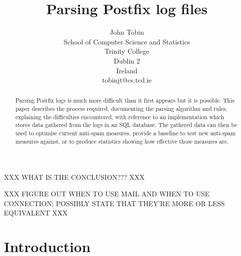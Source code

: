 \documentclass[a4paper,12pt,draft]{article}
\begin{document}
\title{Parsing Postfix log files}
\author{John Tobin \\ School of Computer Science and Statistics \\ 
Trinity College \\ Dublin 2 \\ Ireland \\ tobinjt@cs.tcd.ie}
\date{}
\maketitle

\begin{abstract}

    Parsing Postfix logs is much more difficult than it first appears but
    it is possible.  This paper describes the process required, documenting
    the parsing algorithm and rules, explaining the difficulties
    encountered, with reference to an implementation which stores data
    gathered from the logs in an SQL database.  The gathered data can then
    be used to optimise current anti-spam measures, provide a baseline to
    test new anti-spam measures against, or to produce statistics showing
    how effective those measures are.

\end{abstract}

XXX WHAT IS THE CONCLUSION??? XXX

XXX FIGURE OUT WHEN TO USE MAIL AND WHEN TO USE CONNECTION; POSSIBLY STATE
THAT THEY'RE MORE OR LESS EQUIVALENT  XXX

\newpage
\tableofcontents

\newpage
\section{Introduction}
\end{document}
